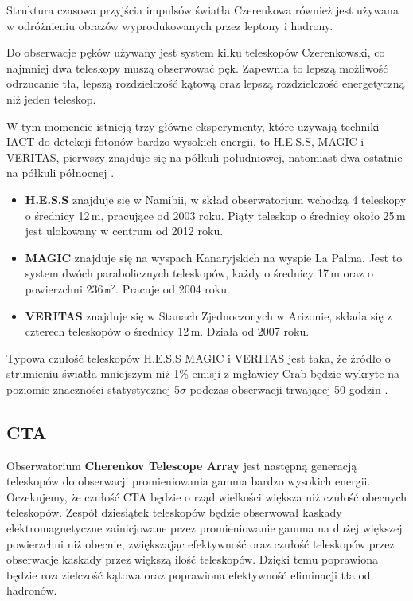 \documentclass[a4paper,11pt,twoside]{article}
\begin{document}
Struktura czasowa przyjścia impulsów światła Czerenkowa również jest używana w odróżnieniu obrazów wyprodukowanych przez leptony i hadrony. 

Do obserwacje pęków używany jest system kilku teleskopów Czerenkowski, co najmniej dwa teleskopy muszą obserwować pęk.  Zapewnia to lepszą możliwość odrzucanie tła, lepszą rozdzielczość kątową oraz lepszą rozdzielczość energetyczną niż jeden teleskop.

W tym momencie istnieją trzy główne eksperymenty, które używają techniki IACT do detekcji fotonów bardzo wysokich energii, to H.E.S.S, MAGIC i VERITAS, pierwszy znajduje się na półkuli południowej, natomiast dwa ostatnie na półkuli północnej \cite{particle_de_angelis}. 
\begin{itemize}
\item {\bf{H.E.S.S}} znajduje się w Namibii, w skład obserwatorium wchodzą 4 teleskopy o średnicy 12\,m, pracujące od 2003 roku. Piąty teleskop o średnicy około 25\,m jest ulokowany w centrum od 2012 roku.
\item {\bf{MAGIC}} znajduje się na wyspach Kanaryjskich na wyspie La Palma. Jest to system dwóch parabolicznych teleskopów, każdy o średnicy 17\,m oraz o powierzchni 236\,$\mathtt{m^2}$. Pracuje od 2004 roku.
\item {\bf{VERITAS}} znajduje się w Stanach Zjednoczonych w Arizonie, składa się z czterech teleskopów o średnicy 12\,m. Działa od 2007 roku.
\end{itemize}
Typowa czułość teleskopów H.E.S.S MAGIC i VERITAS jest taka, że źródło o  strumieniu światła mniejszym niż 1\% emisji z mgławicy Crab będzie wykryte na poziomie znaczności statystycznej 5$\sigma$ podczas obserwacji trwającej 50 godzin \cite{particle_de_angelis}. 
\subsection{CTA}
Obserwatorium {\bf{Cherenkov Telescope Array}} jest następną generacją teleskopów do obserwacji promieniowania gamma bardzo wysokich energii. Oczekujemy, że czułość CTA będzie o rząd wielkości większa niż czułość obecnych teleskopów. 
Zespół dziesiątek teleskopów będzie obserwował kaskady elektromagnetyczne zainicjowane przez promieniowanie gamma na dużej większej powierzchni niż obecnie, zwiększając efektywność oraz czułość teleskopów przez obserwacje kaskady przez większą ilość teleskopów. Dzięki temu poprawiona będzie rozdzielczość kątowa oraz poprawiona efektywność eliminacji tła od hadronów.
\end{document}
